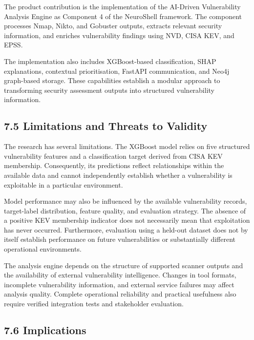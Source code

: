 \documentclass[
]{article}
\begin{document}
The product contribution is the implementation of the AI-Driven
Vulnerability Analysis Engine as Component 4 of the NeuroShell
framework. The component processes Nmap, Nikto, and Gobuster outputs,
extracts relevant security information, and enriches vulnerability
findings using NVD, CISA KEV, and EPSS.

The implementation also includes XGBoost-based classification, SHAP
explanations, contextual prioritisation, FastAPI communication, and
Neo4j graph-based storage. These capabilities establish a modular
approach to transforming security assessment outputs into structured
vulnerability information.

\hypertarget{limitations-and-threats-to-validity}{%
\subsection{7.5 Limitations and Threats to
Validity}\label{limitations-and-threats-to-validity}}

The research has several limitations. The XGBoost model relies on five
structured vulnerability features and a classification target derived
from CISA KEV membership. Consequently, its predictions reflect
relationships within the available data and cannot independently
establish whether a vulnerability is exploitable in a particular
environment.

Model performance may also be influenced by the available vulnerability
records, target-label distribution, feature quality, and evaluation
strategy. The absence of a positive KEV membership indicator does not
necessarily mean that exploitation has never occurred. Furthermore,
evaluation using a held-out dataset does not by itself establish
performance on future vulnerabilities or substantially different
operational environments.

The analysis engine depends on the structure of supported scanner
outputs and the availability of external vulnerability intelligence.
Changes in tool formats, incomplete vulnerability information, and
external service failures may affect analysis quality. Complete
operational reliability and practical usefulness also require verified
integration tests and stakeholder evaluation.

\hypertarget{implications}{%
\subsection{7.6 Implications}\label{implications}}
\end{document}
